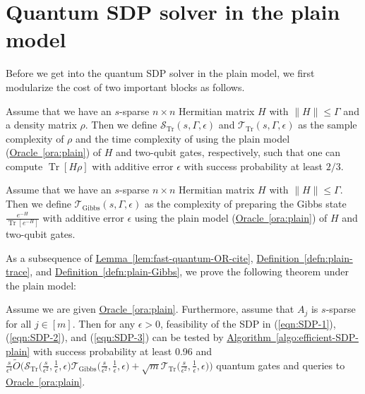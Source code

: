 \documentclass[a4paper,UKenglish,cleveref, autoref]{lipics-v2019}
\theoremstyle{remark}
\numberwithin{equation}{section}
\numberwithin{oracle}{section}
\numberwithin{remark}{section}
\newcommand{\eqn}[1]{(\ref{eqn:#1})}
\newcommand{\ora}[1]{\hyperref[ora:#1]{Oracle~\ref*{ora:#1}}}
\newcommand{\defn}[1]{\hyperref[defn:#1]{Definition~\ref*{defn:#1}}}
\newcommand{\lem}[1]{\hyperref[lem:#1]{Lemma~\ref*{lem:#1}}}
\newcommand{\algo}[1]{\hyperref[algo:#1]{Algorithm~\ref*{algo:#1}}}
\newcommand{\range}[1]{[#1]}
\DeclareMathOperator{\tr}{Tr}
\DeclareMathOperator{\Tr}{Tr}
\begin{document}

\section{Quantum SDP solver in the plain model}\label{append:SDP-plain}
Before we get into the quantum SDP solver in the plain model, we first modularize the cost of two important blocks as follows.

\begin{definition}\label{defn:plain-trace}
Assume that we have an $s$-sparse $n\times n$ Hermitian matrix $H$ with $\|H\|\leq\Gamma$ and a density matrix $\rho$. Then we define $\mathcal{S}_{\tr}(s,\Gamma,\epsilon)$ and $\mathcal{T}_{\tr}(s,\Gamma,\epsilon)$ as the sample complexity of $\rho$ and the time complexity of using the plain model (\ora{plain}) of $H$ and two-qubit gates, respectively, such that one can compute $\tr[H\rho]$ with additive error $\epsilon$ with success probability at least $2/3$.
\end{definition}

\begin{definition}\label{defn:plain-Gibbs}
Assume that we have an $s$-sparse $n\times n$ Hermitian matrix $H$ with $\|H\|\leq\Gamma$. Then we define $\mathcal{T}_{\text{Gibbs}}(s,\Gamma,\epsilon)$ as the complexity of preparing the Gibbs state $\frac{e^{-H}}{\Tr[e^{-H}]}$ with additive error $\epsilon$ using the plain model (\ora{plain}) of $H$ and two-qubit gates.
\end{definition}

As a subsequence of \lem{fast-quantum-OR-cite}, \defn{plain-trace}, and \defn{plain-Gibbs}, we prove the following theorem under the plain model:

\begin{theorem}\label{thm:SDP-feasibility-testing-plain}
Assume we are given \ora{plain}. Furthermore, assume that $A_{j}$ is $s$-sparse for all $j\in\range{m}$. Then for any $\epsilon>0$, feasibility of the SDP in \eqn{SDP-1}, \eqn{SDP-2}, and \eqn{SDP-3} can be tested by \algo{efficient-SDP-plain} with success probability at least 0.96 and $\frac{s}{\epsilon^{4}}\tilde{O}\big(\mathcal{S}_{\tr}\big(\frac{s}{\epsilon^{2}},\frac{1}{\epsilon},\epsilon\big)\mathcal{T}_{\text{Gibbs}}\big(\frac{s}{\epsilon^{2}},\frac{1}{\epsilon},\epsilon\big)+\sqrt{m}\mathcal{T}_{\tr}\big(\frac{s}{\epsilon^{2}},\frac{1}{\epsilon},\epsilon\big)\big)$ quantum gates and queries to \ora{plain}.
\end{theorem}
\end{document}
